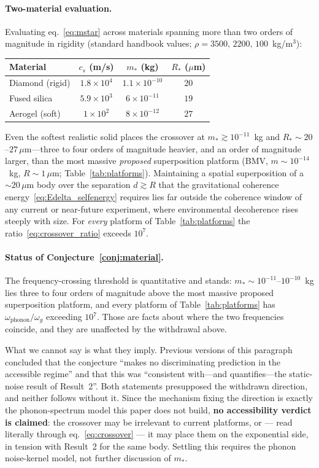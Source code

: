 \documentclass[12pt,a4paper]{article}
\theoremstyle{remark}
\begin{document}
\paragraph{Two-material evaluation.} Evaluating
eq.~\eqref{eq:mstar} across materials spanning more than two orders of magnitude in
rigidity (standard handbook values; $\rho = 3500,\,2200,\,100$~kg/m$^3$):
\begin{center}
\begin{tabular}{lccc}
\toprule
Material & $c_s$ (m/s) & $m_\ast$ (kg) & $R_\ast$ ($\mu$m) \\
\midrule
Diamond (rigid) & $1.8\times10^{4}$ & $1.1\times10^{-10}$ & $20$ \\
Fused silica    & $5.9\times10^{3}$ & $6\times10^{-11}$   & $19$ \\
Aerogel (soft)  & $1\times10^{2}$   & $8\times10^{-12}$   & $27$ \\
\bottomrule
\end{tabular}
\end{center}
Even the softest realistic solid places the crossover at $m_\ast\gtrsim10^{-11}$~kg and
$R_\ast\sim20$--$27\,\mu$m---three to four orders of magnitude heavier, and an order of
magnitude larger, than the most massive \emph{proposed} superposition platform (BMV,
$m\sim10^{-14}$~kg, $R\sim1\,\mu$m; Table~\ref{tab:platforms}). Maintaining a spatial
superposition of a $\sim\!20\,\mu$m body over the separation $d\gtrsim R$ that the
gravitational coherence energy~\eqref{eq:Edelta_selfenergy} requires lies far outside the
coherence window of any current or near-future experiment, where environmental
decoherence rises steeply with size. For \emph{every} platform of
Table~\ref{tab:platforms} the ratio~\eqref{eq:crossover_ratio} exceeds $10^{7}$.

\paragraph{Status of Conjecture~\ref{conj:material}.} The frequency-crossing threshold
is quantitative and stands: $m_\ast\sim10^{-11}$--$10^{-10}$~kg lies three to four orders
of magnitude above the most massive proposed superposition platform, and every platform of
Table~\ref{tab:platforms} has $\omega_{\text{phonon}}/\omega_g$ exceeding $10^{7}$. Those
are facts about where the two frequencies coincide, and they are unaffected by the
withdrawal above.

What we cannot say is what they imply. Previous versions of this paragraph concluded that
the conjecture ``makes no discriminating prediction in the accessible regime'' and that
this was ``consistent with---and quantifies---the static-noise result of Result~2''. Both
statements presupposed the withdrawn direction, and neither follows without it. Since the
mechanism fixing the direction is exactly the phonon-spectrum model this paper does not
build, \textbf{no accessibility verdict is claimed}: the crossover may be irrelevant to
current platforms, or --- read literally through eq.~\eqref{eq:crossover} --- it may place
them on the exponential side, in tension with Result~2 for the same body. Settling this
requires the phonon noise-kernel model, not further discussion of $m_\ast$.
\end{document}
